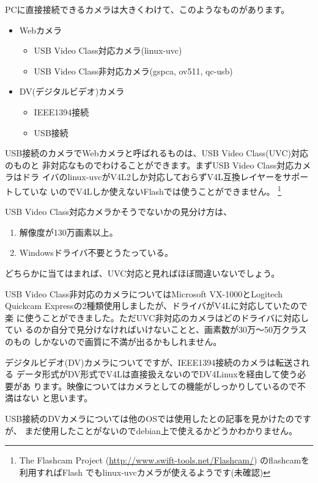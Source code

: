 \documentclass[mingoth,a4paper]{jsarticle}
\begin{document}
PCに直接接続できるカメラは大きくわけて、このようなものがあります。

\begin{itemize}
 \item Webカメラ
       \begin{itemize}
	\item USB Video Class対応カメラ(linux-uvc)
	\item USB Video Class非対応カメラ(gspca, ov511, qc-usb)
       \end{itemize}
 \item DV(デジタルビデオ)カメラ
       \begin{itemize}
	\item IEEE1394接続
	\item USB接続
       \end{itemize}
\end{itemize}

USB接続のカメラでWebカメラと呼ばれるものは、USB Video Class(UVC)対応のものと
非対応なものでわけることができます。まずUSB Video Class対応カメラはドラ
イバのlinux-uvcがV4L2しか対応しておらずV4L互換レイヤーをサポートしていな
いのでV4Lしか使えないFlashでは使うことができません。
\footnote{The Flashcam Project
(\url{http://www.swift-tools.net/Flashcam/}) のflashcamを利用すればFlash
でもlinux-uvcカメラが使えるようです(未確認)}

USB Video Class対応カメラかそうでないかの見分け方は、

\begin{enumerate}
 \item 解像度が130万画素以上。
 \item Windowsドライバ不要とうたっている。
\end{enumerate}

どちらかに当てはまれば、UVC対応と見ればほぼ間違いないでしょう。


USB Video Class非対応のカメラについてはMicrosoft VX-1000とLogitech
Quickcam Expressの2種類使用しましたが、ドライバがV4Lに対応していたので楽
に使うことができました。ただUVC非対応のカメラはどのドライバに対応してい
るのか自分で見分けなければいけないことと、画素数が30万〜50万クラスのもの
しかないので画質に不満が出るかもしれません。


デジタルビデオ(DV)カメラについてですが、IEEE1394接続のカメラは転送される
データ形式がDV形式でV4Lは直接扱えないのでDV4Linuxを経由して使う必要があ
ります。映像についてはカメラとしての機能がしっかりしているので不満はない
と思います。


USB接続のDVカメラについては他のOSでは使用したとの記事を見かけたのですが、
まだ使用したことがないのでdebian上で使えるかどうかわかりません。
\end{document}
